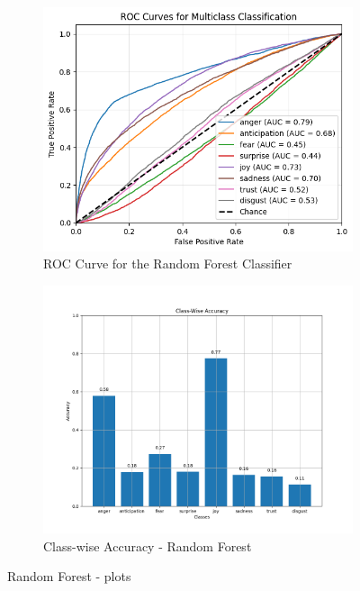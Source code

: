 \begin{figure}[H]
    \centering
    \begin{subfigure}{0.45\textwidth}
        \centering
        \includegraphics[width=\textwidth]{pictures/roc_rf.png}
        \caption{ROC Curve for the Random Forest Classifier}
        \label{fig:roc_rf}
    \end{subfigure}
    \begin{subfigure}{0.45\textwidth}
        \centering
        \includegraphics[width=\textwidth]{pictures/class_accuracy.png}
        \caption{Class-wise Accuracy - Random Forest}
        \label{fig:cwa_rf}
    \end{subfigure}
    \caption{Random Forest - plots}
    \label{fig:side_by_side}
\end{figure}

